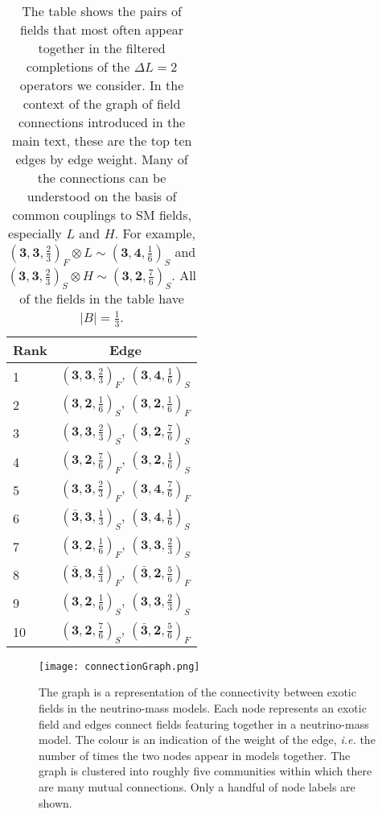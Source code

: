 \begin{table}[t]
  \centering
  \begin{tabular}[t]{lc}
    \toprule
    Rank & Edge \\
    \midrule
    1 & $(\mathbf{3}, \mathbf{3}, \tfrac{2}{3})_{F}$, $(\mathbf{3}, \mathbf{4}, \tfrac{1}{6})_{S}$ \\
    2 & $(\mathbf{3}, \mathbf{2}, \tfrac{1}{6})_{S}$, $(\mathbf{3}, \mathbf{2}, \tfrac{1}{6})_{F}$ \\
    3 & $(\mathbf{3}, \mathbf{3}, \tfrac{2}{3})_{S}$, $(\mathbf{3}, \mathbf{2}, \tfrac{7}{6})_{S}$ \\
    4 & $(\mathbf{3}, \mathbf{2}, \tfrac{7}{6})_{F}$, $(\mathbf{3}, \mathbf{2}, \tfrac{1}{6})_{S}$ \\
    5 & $(\mathbf{3}, \mathbf{3}, \tfrac{2}{3})_{F}$, $(\mathbf{3}, \mathbf{4}, \tfrac{7}{6})_{F}$ \\
    6 & $(\mathbf{\bar{3}}, \mathbf{3}, \tfrac{1}{3})_{S}$, $(\mathbf{3}, \mathbf{4}, \tfrac{1}{6})_{S}$ \\
    7 & $(\mathbf{3}, \mathbf{2}, \tfrac{1}{6})_{F}$, $(\mathbf{3}, \mathbf{3}, \tfrac{2}{3})_{S}$ \\
    8 & $(\mathbf{\bar{3}}, \mathbf{3}, \tfrac{4}{3})_{F}$, $(\mathbf{\bar{3}}, \mathbf{2}, \tfrac{5}{6})_{F}$ \\
    9 & $(\mathbf{3}, \mathbf{2}, \tfrac{1}{6})_{S}$, $(\mathbf{3}, \mathbf{3}, \tfrac{2}{3})_{S}$ \\
    10 & $(\mathbf{3}, \mathbf{2}, \tfrac{7}{6})_{S}$, $(\mathbf{\bar{3}}, \mathbf{2}, \tfrac{5}{6})_{F}$ \\
    \bottomrule
  \end{tabular}
  \caption{The table shows the pairs of fields that most often appear together
    in the filtered completions of the $\Delta L = 2$ operators we consider. In
    the context of the graph of field connections introduced in the main text,
    these are the top ten edges by edge weight. Many of the connections can be
    understood on the basis of common couplings to SM fields, especially $L$ and
    $H$. For example,
    $(\mathbf{3}, \mathbf{3}, \tfrac{2}{3})_{F} \otimes L \sim (\mathbf{3}, \mathbf{4}, \tfrac{1}{6})_{S}$
    and
    $(\mathbf{3}, \mathbf{3}, \tfrac{2}{3})_{S} \otimes H \sim (\mathbf{3}, \mathbf{2}, \tfrac{7}{6})_{S}$.
    All of the fields in the table have $|B| = \tfrac{1}{3}$.}
  \label{tab:graph-info}
\end{table}

\begin{figure}[t]
  \centering
  \texttt{[image: connectionGraph.png]}
  \caption{The graph is a representation of the connectivity between exotic
    fields in the neutrino-mass models. Each node represents an exotic field and
    edges connect fields featuring together in a neutrino-mass model. The colour
    is an indication of the weight of the edge, \textit{i.e.} the number of
    times the two nodes appear in models together. The graph is clustered into
    roughly five communities within which there are many mutual connections.
    Only a handful of node labels are shown.}
  \label{fig:model-graph}
\end{figure}

